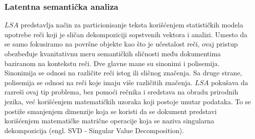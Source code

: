 \documentclass[a4paper]{article}
\begin{document}
\subsubsection{Latentna semantička analiza}
$LSA$ predstavlja način za particionisanje teksta korišćenjem statističkih modela upotrebe reči koji je sličan dekompoziciji sopstvenih vektora i analizi. Umesto da se samo fokusiramo na površne objekte kao što je učestalost reči, ovaj pristup obezbeđuje kvanitativnu meru semantičkih sličnosti među dokumentima baziranom na kontekstu reči. Dve glavne mane su sinonimi i polisemija. Sinonimija se odnosi na različite reči istog ili sličnog značenja. Sa druge strane, polisemija se odnosi na reči koje imaju više različitih značenja. $LSA$ pokušava da razreši ovaj tip problema, bez pomoći rečnika i sredstava na obradu prirodnih jezika, već korišćenjem matematičkih uzoraka koji postoje unutar podataka. To se postiže smanjenjem dimenzije koja se koristi da se dokument predstavi korišćenjem matematičke matrične operacije koja se naziva singularna dekompozicija (engl. SVD - Singular Value Decomposition).
\end{document}
